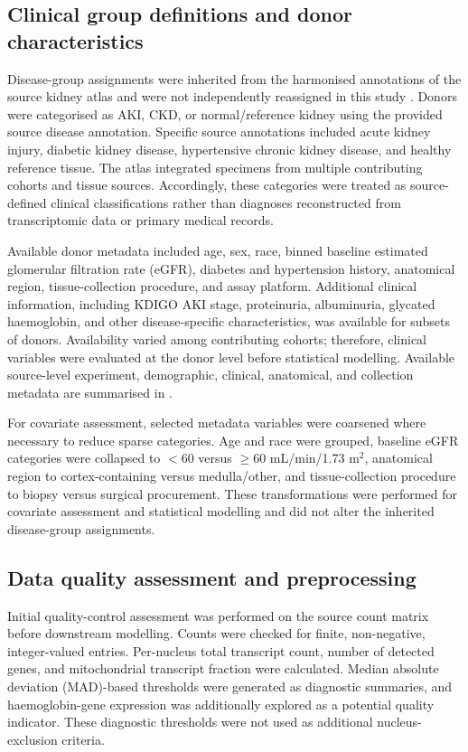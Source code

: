 \documentclass[10pt,letterpaper]{article}
\begin{document}
\subsection*{Clinical group definitions and donor characteristics}

Disease-group assignments were inherited from the harmonised annotations of the source kidney atlas and were not independently reassigned in this study \cite{lakeAtlasHealthyInjured2023}. Donors were categorised as AKI, CKD, or normal/reference kidney using the provided source disease annotation. Specific source annotations included acute kidney injury, diabetic kidney disease, hypertensive chronic kidney disease, and healthy reference tissue. The atlas integrated specimens from multiple contributing cohorts and tissue sources. Accordingly, these categories were treated as source-defined clinical classifications rather than diagnoses reconstructed from transcriptomic data or primary medical records.

Available donor metadata included age, sex, race, binned baseline estimated glomerular filtration rate (eGFR), diabetes and hypertension history, anatomical region, tissue-collection procedure, and assay platform. Additional clinical information, including KDIGO AKI stage, proteinuria, albuminuria, glycated haemoglobin, and other disease-specific characteristics, was available for subsets of donors. Availability varied among contributing cohorts; therefore, clinical variables were evaluated at the donor level before statistical modelling. Available source-level experiment, demographic, clinical, anatomical, and collection metadata are summarised in .

For covariate assessment, selected metadata variables were coarsened where necessary to reduce sparse categories. Age and race were grouped, baseline eGFR categories were collapsed to $<60$ versus $\geq60$ mL/min/1.73 m$^2$, anatomical region to cortex-containing versus medulla/other, and tissue-collection procedure to biopsy versus surgical procurement. These transformations were performed for covariate assessment and statistical modelling and did not alter the inherited disease-group assignments.


\subsection*{Data quality assessment and preprocessing}

Initial quality-control assessment was performed on the source count matrix before downstream modelling. Counts were checked for finite, non-negative, integer-valued entries. Per-nucleus total transcript count, number of detected genes, and mitochondrial transcript fraction were calculated. Median absolute deviation (MAD)-based thresholds were generated as diagnostic summaries, and haemoglobin-gene expression was additionally explored as a potential quality indicator. These diagnostic thresholds were not used as additional nucleus-exclusion criteria.
\end{document}
